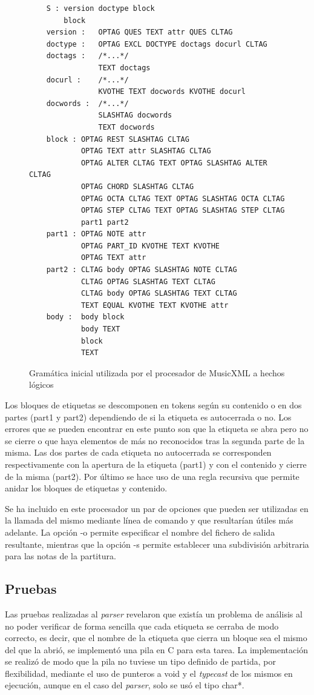\begin{figure}
	\centering
	\begin{verbatim}
	S : version doctype block
	    block
	version : 	OPTAG QUES TEXT attr QUES CLTAG
	doctype : 	OPTAG EXCL DOCTYPE doctags docurl CLTAG
	doctags : 	/*...*/
	            TEXT doctags
	docurl : 	/*...*/
	            KVOTHE TEXT docwords KVOTHE docurl
	docwords : 	/*...*/
	            SLASHTAG docwords
	            TEXT docwords
	block : OPTAG REST SLASHTAG CLTAG
	        OPTAG TEXT attr SLASHTAG CLTAG
	        OPTAG ALTER CLTAG TEXT OPTAG SLASHTAG ALTER CLTAG
	        OPTAG CHORD SLASHTAG CLTAG
	        OPTAG OCTA CLTAG TEXT OPTAG SLASHTAG OCTA CLTAG
	        OPTAG STEP CLTAG TEXT OPTAG SLASHTAG STEP CLTAG
	        part1 part2
	part1 : OPTAG NOTE attr
	        OPTAG PART_ID KVOTHE TEXT KVOTHE
	        OPTAG TEXT attr
	part2 : CLTAG body OPTAG SLASHTAG NOTE CLTAG
	        CLTAG OPTAG SLASHTAG TEXT CLTAG
	        CLTAG body OPTAG SLASHTAG TEXT CLTAG
	        TEXT EQUAL KVOTHE TEXT KVOTHE attr
	body : 	body block
	        body TEXT
	        block
	        TEXT
	\end{verbatim}
	\caption{Gramática inicial utilizada por el procesador de MusicXML a hechos lógicos}
	\label{fig:gramatica_inicial}
\end{figure}

Los bloques de etiquetas se descomponen en tokens según su contenido o en dos partes (part1 y part2) dependiendo de si la etiqueta es autocerrada o no. Los errores que se pueden encontrar en este punto son que la etiqueta se abra pero no se cierre o que haya elementos de más no reconocidos tras la segunda parte de la misma. Las dos partes de cada etiqueta no autocerrada se corresponden respectivamente con la apertura de la etiqueta (part1) y con el contenido y cierre de la misma (part2). Por último se hace uso de una regla recursiva que permite anidar los bloques de etiquetas y contenido.

Se ha incluido en este procesador un par de opciones que pueden ser utilizadas en la llamada del mismo mediante línea de comando y que resultarían útiles más adelante. La opción -o permite especificar el nombre del fichero de salida resultante, mientras que la opción -s permite establecer una subdivisión arbitraria para las notas de la partitura.

\subsection{Pruebas}
\label{subsec:first_iteration_test}
Las pruebas realizadas al \textit{parser} revelaron que existía un problema de análisis al no poder verificar de forma sencilla que cada etiqueta se cerraba de modo correcto, es decir, que el nombre de la etiqueta que cierra un bloque sea el mismo del que la abrió, se implementó una pila en C para esta tarea. La implementación se realizó de modo que la pila no tuviese un tipo definido de partida, por flexibilidad, mediante el uso de punteros a void y el \textit{typecast} de los mismos en ejecución, aunque en el caso del \textit{parser}, solo se usó el tipo char*.

